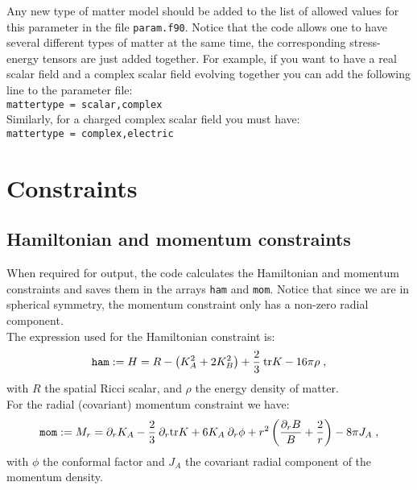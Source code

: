 \documentclass[12pt]{article}
\begin{document}
Any new type of matter model should be added to the list of allowed
values for this parameter in the file \texttt{param.f90}. Notice that
the code allows one to have several different types of matter at the
same time, the corresponding stress-energy tensors are just added
together. For example, if you want to have a real scalar field and a
complex scalar field evolving together you can add the following line
to the parameter file: \\

\texttt{mattertype = scalar,complex} \\

Similarly, for a charged complex scalar field you must have: \\

\texttt{mattertype = complex,electric} \\

\vspace{3mm}



\setcounter{equation}{0}
\section{Constraints}
\label{sec:constraints}

\subsection{Hamiltonian and momentum constraints}

When required for output, the code calculates the Hamiltonian and
momentum constraints and saves them in the arrays \texttt{ham} and
\texttt{mom}.  Notice that since we are in spherical symmetry, the
momentum constraint only has a non-zero radial component. \\

The expression used for the Hamiltonian constraint is:
\begin{equation}
\texttt{ham} := H = R - \left( K_A^2 + 2 K_B^2 \right) + \frac{2}{3} \: {\rm tr} K
- 16 \pi \rho \;,
\end{equation}
with $R$ the spatial Ricci scalar, and $\rho$ the energy density of
matter. \\

For the radial (covariant) momentum constraint we have:
\begin{equation}
\texttt{mom} := M_r = \partial_r K_A - \frac{2}{3} \: \partial_r {\rm tr} K
+ 6 K_A \: \partial_r \phi + r^2 \left( \frac{\partial_r B}{B} + \frac{2}{r} \right)
- 8 \pi J_A \; ,
\end{equation}
with $\phi$ the conformal factor and $J_A$ the covariant radial
component of the momentum density. \\
\end{document}
